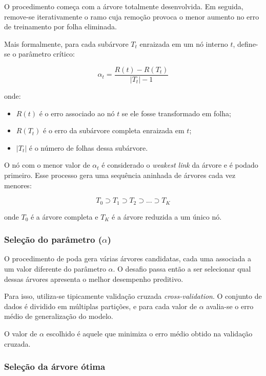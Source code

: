 \documentclass{article}
\begin{document}
O procedimento começa com a árvore totalmente desenvolvida. Em seguida, remove-se 
iterativamente o ramo cuja remoção provoca o menor aumento no erro de treinamento 
por folha eliminada.

Mais formalmente, para cada subárvore $T_t$ enraizada em um nó interno $t$,
define-se o parâmetro crítico:

\begin{equation}
    \alpha_t = \frac{R(t) - R(T_t)}{|T_t| - 1}
\end{equation}

onde:

\begin{itemize}
    \item $R(t)$ é o erro associado ao nó $t$ se ele fosse transformado em folha;
    \item $R(T_t)$ é o erro da subárvore completa enraizada em $t$;
    \item $|T_t|$ é o número de folhas dessa subárvore.
\end{itemize}

O nó com o menor valor de $\alpha_t$ é considerado o \textit{weakest link}
da árvore e é podado primeiro. Esse processo gera uma sequência aninhada de 
árvores cada vez menores:

\begin{equation}
    T_0 \supset T_1 \supset T_2 \supset ... \supset T_K
\end{equation}

onde $T_0$ é a árvore completa e $T_K$ é a árvore reduzida a um único nó.

\subsubsection{Seleção do parâmetro \texorpdfstring{($\alpha$)}{α}}

O procedimento de poda gera várias árvores candidatas, cada uma associada
a um valor diferente do parâmetro $\alpha$. O desafio passa então a ser
selecionar qual dessas árvores apresenta o melhor desempenho preditivo.

Para isso, utiliza-se tipicamente validação cruzada \textit{cross-validation}. 
O conjunto de dados é dividido em múltiplas partições, e para cada valor de 
$\alpha$ avalia-se o erro médio de generalização do modelo.

O valor de $\alpha$ escolhido é aquele que minimiza o erro médio obtido
na validação cruzada.

\subsubsection{Seleção da árvore ótima}
\end{document}
